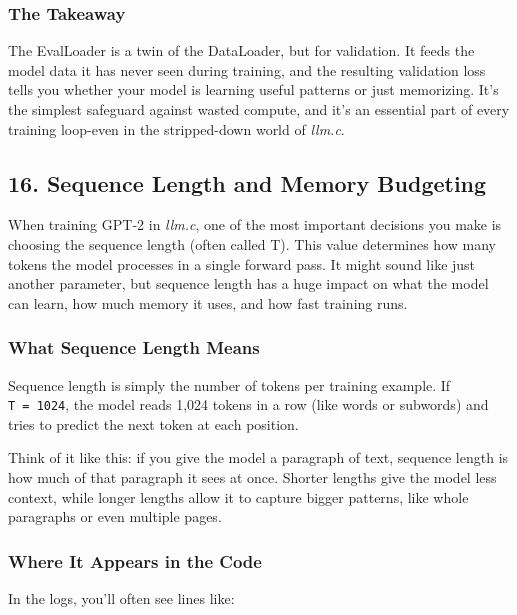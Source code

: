 \documentclass[
  letterpaper,
  DIV=11,
  numbers=noendperiod]{scrreprt}
\begin{document}
\subsubsection{The Takeaway}\label{the-takeaway-4}

The EvalLoader is a twin of the DataLoader, but for validation. It feeds
the model data it has never seen during training, and the resulting
validation loss tells you whether your model is learning useful patterns
or just memorizing. It's the simplest safeguard against wasted compute,
and it's an essential part of every training loop-even in the
stripped-down world of \emph{llm.c}.

\subsection{16. Sequence Length and Memory
Budgeting}\label{sequence-length-and-memory-budgeting}

When training GPT-2 in \emph{llm.c}, one of the most important decisions
you make is choosing the sequence length (often called T). This value
determines how many tokens the model processes in a single forward pass.
It might sound like just another parameter, but sequence length has a
huge impact on what the model can learn, how much memory it uses, and
how fast training runs.

\subsubsection{What Sequence Length
Means}\label{what-sequence-length-means}

Sequence length is simply the number of tokens per training example. If
\texttt{T\ =\ 1024}, the model reads 1,024 tokens in a row (like words
or subwords) and tries to predict the next token at each position.

Think of it like this: if you give the model a paragraph of text,
sequence length is how much of that paragraph it sees at once. Shorter
lengths give the model less context, while longer lengths allow it to
capture bigger patterns, like whole paragraphs or even multiple pages.

\subsubsection{Where It Appears in the
Code}\label{where-it-appears-in-the-code}

In the logs, you'll often see lines like:
\end{document}
